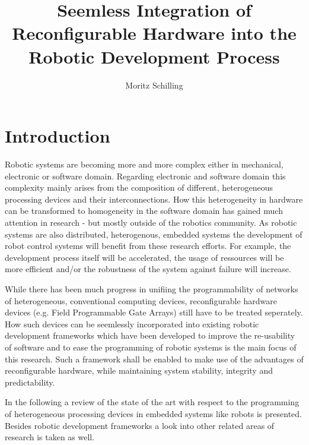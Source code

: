 \documentclass[a4paper,twocolumn]{esapub2005} %
\title{Seemless Integration of Reconfigurable Hardware into the Robotic Development Process}
\author{Moritz Schilling}
\affil{DFKI GmbH, Robert-Hooke-Str. 5, 28359 Bremen, Germany}
\affil{TEC-MMA, ESTEC, 2200 AG Noordwijk, The Netherlands}
\begin{document}
\maketitle




\section{Introduction}

Robotic systems are becoming more and more complex either in mechanical, electronic or software domain.
Regarding electronic and software domain this complexity mainly arises from the composition of different, heterogeneous processing devices and their interconnections.
How this heterogeneity in hardware can be transformed to homogeneity in the software domain has gained much attention in research - but mostly outside of the robotics community.
As robotic systems are also distributed, heterogenous, embedded systems the development of robot control systems will benefit from these research efforts.
For example, the development process itself will be accelerated, the usage of ressources will be more efficient and/or the robustness of the system against failure will increase.

While there has been much progress in unifiing the programmability of networks of heterogeneous, conventional computing devices,
reconfigurable hardware devices (e.g. Field Programmable Gate Arrays) still have to be treated seperately.
How such devices can be seemlessly incorporated into existing robotic development frameworks which have been developed to improve the re-usability of software and to ease the programming of robotic systems is the main focus of this research.
Such a framework shall be enabled to make use of the advantages of reconfigurable hardware, while maintaining system stability, integrity and predictability.

In the following a review of the state of the art with respect to the programming of heterogeneous processing devices in embedded systems like robots is presented. Besides robotic development frameworks a look into other related areas of research is taken as well.
\end{document}
